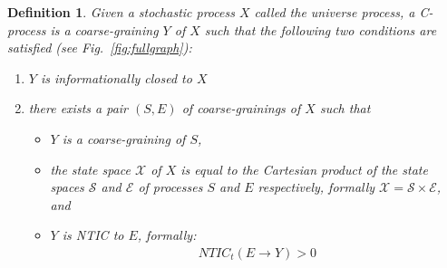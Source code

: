 \documentclass[utf8]{article}
\newtheorem{definition}{Definition}
\begin{document}
        \begin{definition}
        Given a stochastic process $X$ called the universe process, a \emph{C-process} is a coarse-graining $Y$ of $X$ such that the following two conditions are satisfied (see Fig.~\ref{fig:fullgraph}):
        \begin{enumerate}
        \item $Y$ is informationally closed to $X$
        \item there exists a pair $(S,E)$ of coarse-grainings of $X$ such that 
        \begin{itemize}
            \item $Y$ is a coarse-graining of $S$,
            \item the state space $\mathcal{X}$ of $X$ is equal to the Cartesian product of the state spaces $\mathcal{S}$ and $\mathcal{E}$ of processes $S$ and $E$ respectively, formally $\mathcal{X}=\mathcal{S}\times\mathcal{E}$, and 
            \item $Y$ is NTIC to $E$, formally:
        \begin{align}
            NTIC_t(E\rightarrow Y) >0
        \end{align}
        \end{itemize} 
        \end{enumerate}
       \end{definition}
       
\end{document}
